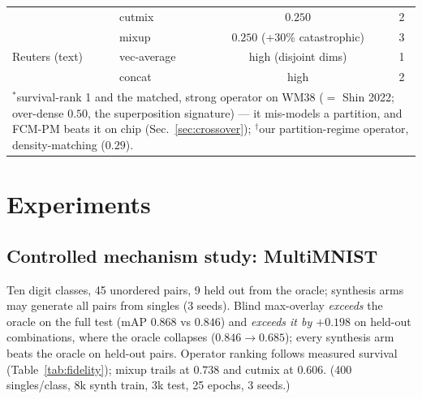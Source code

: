 \documentclass[11pt]{article}
\begin{document}
\begin{table}[t]
\begin{tabular}{llcc}
                 & cutmix         & $0.250$        & 2 \\
                 & mixup          & $0.250$ (+30\% catastrophic) & 3 \\
\midrule
Reuters (text)   & vec-average    & high (disjoint dims) & 1 \\
                 & concat         & high           & 2 \\
\bottomrule
\multicolumn{4}{l}{\footnotesize $^{\ast}$survival-rank 1 and the matched, strong operator on WM38 ($=$ Shin 2022; over-dense $0.50$, the superposition signature) --- it mis-models a partition, and FCM-PM beats it on chip (Sec.~\ref{sec:crossover}); $^{\dagger}$our partition-regime operator, density-matching ($0.29$).}
\end{tabular}
\end{table}

\section{Experiments}\label{sec:experiments}

\subsection{Controlled mechanism study: MultiMNIST}
Ten digit classes, 45 unordered pairs, 9 held out from the oracle;
synthesis arms may generate all pairs from singles (3 seeds). Blind
max-overlay \emph{exceeds} the oracle on the full test (mAP $0.868$ vs
$0.846$) and \emph{exceeds it by $+0.198$} on held-out combinations, where
the oracle collapses ($0.846 \to 0.685$); every synthesis arm beats the
oracle on held-out pairs. Operator ranking follows measured survival
(Table~\ref{tab:fidelity}); mixup trails at $0.738$ and cutmix at $0.606$.
(400 singles/class, 8k synth train, 3k test, 25 epochs, 3 seeds.)
\end{document}
